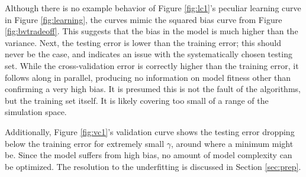Although there is no example behavior of Figure \ref{fig:lc1}'s peculiar
learning curve in Figure \ref{fig:learning}, the curves mimic the squared bias
curve from Figure \ref{fig:bvtradeoff}. This suggests that the bias in the
model is much higher than the variance.  Next, the testing error is lower than
the training error; this should never be the case, and indicates an issue with
the systematically chosen testing set.  While the cross-validation error is
correctly higher than the training error, it follows along in parallel,
producing no information on model fitness other than confirming a very high
bias.  It is presumed this is not the fault of the algorithms, but the training
set itself.  It is likely covering too small of a range of the simulation
space.

Additionally, Figure \ref{fig:vc1}'s validation curve shows the testing error
dropping below the training error for extremely small $\gamma$, around where a
minimum might be.  Since the model suffers from high bias, no amount of model
complexity can be optimized. The resolution to the underfitting is discussed in
Section \ref{sec:prep}.


